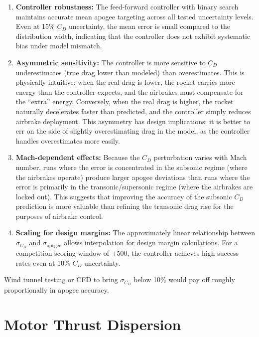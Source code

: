 \documentclass[11pt,letterpaper]{article}
\newcommand{\Cd}{C_D}
\begin{document}
\begin{enumerate}[nosep]
    \item \textbf{Controller robustness:} The feed-forward controller with binary search maintains accurate mean apogee targeting across all tested uncertainty levels. Even at 15\% $\Cd$ uncertainty, the mean error is small compared to the distribution width, indicating that the controller does not exhibit systematic bias under model mismatch.

    \item \textbf{Asymmetric sensitivity:} The controller is more sensitive to $\Cd$ underestimates (true drag lower than modeled) than overestimates. This is physically intuitive: when the real drag is lower, the rocket carries more energy than the controller expects, and the airbrakes must compensate for the ``extra'' energy. Conversely, when the real drag is higher, the rocket naturally decelerates faster than predicted, and the controller simply reduces airbrake deployment. This asymmetry has design implications: it is better to err on the side of slightly overestimating drag in the model, as the controller handles overestimates more easily.

    \item \textbf{Mach-dependent effects:} Because the $\Cd$ perturbation varies with Mach number, runs where the error is concentrated in the subsonic regime (where the airbrakes operate) produce larger apogee deviations than runs where the error is primarily in the transonic/supersonic regime (where the airbrakes are locked out). This suggests that improving the accuracy of the subsonic $\Cd$ prediction is more valuable than refining the transonic drag rise for the purposes of airbrake control.

    \item \textbf{Scaling for design margins:} The approximately linear relationship between $\sigma_{\Cd}$ and $\sigma_{\mathrm{apogee}}$ allows interpolation for design margin calculations. For a competition scoring window of $\pm$\SI{500}{\ft}, the controller achieves high success rates even at 10\% $\Cd$ uncertainty.
\end{enumerate}

Wind tunnel testing or CFD to bring $\sigma_{\Cd}$ below 10\% would pay off roughly proportionally in apogee accuracy.


\section{Motor Thrust Dispersion}
\label{sec:thrust}
\end{document}
